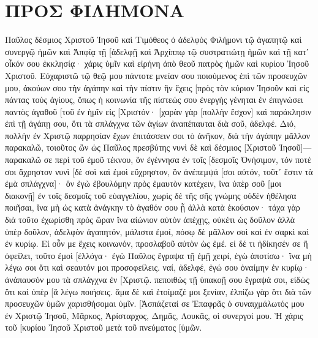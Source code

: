 \section{ΠΡΟΣ ΦΙΛΗΜΟΝΑ}
Παῦλος δέσμιος Χριστοῦ Ἰησοῦ καὶ Τιμόθεος ὁ ἀδελφὸς Φιλήμονι τῷ ἀγαπητῷ καὶ συνεργῷ ἡμῶν 
καὶ Ἀπφίᾳ τῇ [ἀδελφῇ καὶ Ἀρχίππῳ τῷ συστρατιώτῃ ἡμῶν καὶ τῇ κατ᾽ οἶκόν σου ἐκκλησίᾳ· 
χάρις ὑμῖν καὶ εἰρήνη ἀπὸ θεοῦ πατρὸς ἡμῶν καὶ κυρίου Ἰησοῦ Χριστοῦ. 
Εὐχαριστῶ τῷ θεῷ μου πάντοτε μνείαν σου ποιούμενος ἐπὶ τῶν προσευχῶν μου, 
ἀκούων σου τὴν ἀγάπην καὶ τὴν πίστιν ἣν ἔχεις [πρὸς τὸν κύριον Ἰησοῦν καὶ εἰς πάντας τοὺς ἁγίους, 
ὅπως ἡ κοινωνία τῆς πίστεώς σου ἐνεργὴς γένηται ἐν ἐπιγνώσει παντὸς ἀγαθοῦ [τοῦ ἐν ἡμῖν εἰς [Χριστόν· 
[χαρὰν γὰρ [πολλὴν ἔσχον] καὶ παράκλησιν ἐπὶ τῇ ἀγάπῃ σου, ὅτι τὰ σπλάγχνα τῶν ἁγίων ἀναπέπαυται διὰ σοῦ, ἀδελφέ. 
Διό, πολλὴν ἐν Χριστῷ παρρησίαν ἔχων ἐπιτάσσειν σοι τὸ ἀνῆκον, 
διὰ τὴν ἀγάπην μᾶλλον παρακαλῶ, τοιοῦτος ὢν ὡς Παῦλος πρεσβύτης νυνὶ δὲ καὶ δέσμιος [Χριστοῦ Ἰησοῦ]— 
παρακαλῶ σε περὶ τοῦ ἐμοῦ τέκνου, ὃν ἐγέννησα ἐν τοῖς [δεσμοῖς Ὀνήσιμον, 
τόν ποτέ σοι ἄχρηστον νυνὶ [δὲ σοὶ καὶ ἐμοὶ εὔχρηστον, 
ὃν ἀνέπεμψά [σοι αὐτόν, τοῦτ᾽ ἔστιν τὰ ἐμὰ σπλάγχνα]· 
ὃν ἐγὼ ἐβουλόμην πρὸς ἐμαυτὸν κατέχειν, ἵνα ὑπὲρ σοῦ [μοι διακονῇ] ἐν τοῖς δεσμοῖς τοῦ εὐαγγελίου, 
χωρὶς δὲ τῆς σῆς γνώμης οὐδὲν ἠθέλησα ποιῆσαι, ἵνα μὴ ὡς κατὰ ἀνάγκην τὸ ἀγαθόν σου ᾖ ἀλλὰ κατὰ ἑκούσιον· 
τάχα γὰρ διὰ τοῦτο ἐχωρίσθη πρὸς ὥραν ἵνα αἰώνιον αὐτὸν ἀπέχῃς, 
οὐκέτι ὡς δοῦλον ἀλλὰ ὑπὲρ δοῦλον, ἀδελφὸν ἀγαπητόν, μάλιστα ἐμοί, πόσῳ δὲ μᾶλλον σοὶ καὶ ἐν σαρκὶ καὶ ἐν κυρίῳ. 
Εἰ οὖν με ἔχεις κοινωνόν, προσλαβοῦ αὐτὸν ὡς ἐμέ. 
εἰ δέ τι ἠδίκησέν σε ἢ ὀφείλει, τοῦτο ἐμοὶ [ἐλλόγα· 
ἐγὼ Παῦλος ἔγραψα τῇ ἐμῇ χειρί, ἐγὼ ἀποτίσω· ἵνα μὴ λέγω σοι ὅτι καὶ σεαυτόν μοι προσοφείλεις. 
ναί, ἀδελφέ, ἐγώ σου ὀναίμην ἐν κυρίῳ· ἀνάπαυσόν μου τὰ σπλάγχνα ἐν [Χριστῷ. 
πεποιθὼς τῇ ὑπακοῇ σου ἔγραψά σοι, εἰδὼς ὅτι καὶ ὑπὲρ [ἃ λέγω ποιήσεις. 
ἅμα δὲ καὶ ἑτοίμαζέ μοι ξενίαν, ἐλπίζω γὰρ ὅτι διὰ τῶν προσευχῶν ὑμῶν χαρισθήσομαι ὑμῖν. 
[Ἀσπάζεταί σε Ἐπαφρᾶς ὁ συναιχμάλωτός μου ἐν Χριστῷ Ἰησοῦ, 
Μᾶρκος, Ἀρίσταρχος, Δημᾶς, Λουκᾶς, οἱ συνεργοί μου. 
Ἡ χάρις τοῦ [κυρίου Ἰησοῦ Χριστοῦ μετὰ τοῦ πνεύματος [ὑμῶν. 
